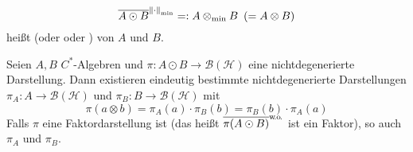 \begin{definition}[{name=[{minimales Tensorprodukt}]}]
	\[
		\overline{A \odot B}^{\norm*{\cdot }_{\min}} =: A \otimes_{\min}B \enspace(= {A \otimes B})
	\]
	heißt  (oder  oder )  von $A$ und $B$.
\end{definition}

\begin{satz}[{name=[{Zerlegung von Darstellungen des algebraischen Tensorproduktes}]},label=satz:111]
	Seien $A,B$ $C^*$-Algebren und $\pi \colon A \odot B \to \mathcal{B}(\mathcal{H})$ eine nichtdegenerierte Darstellung.
	Dann existieren eindeutig bestimmte nichtdegenerierte Darstellungen $\pi_A \colon A \to \mathcal{B}(\mathcal{H})$ und $\pi_B \colon B \to \mathcal{B}(\mathcal{H})$ mit 
	\[
		\pi(a \otimes b) = \pi_A(a) \cdot \pi_B(b)=\pi_B(b) \cdot \pi_A(a)
	\]
	Falls $\pi$ eine Faktordarstellung ist (das heißt $\overline{\pi(A \odot B)}^{\wo}$ ist ein Faktor), so auch $\pi_A$ und $\pi_B$.
\end{satz}
